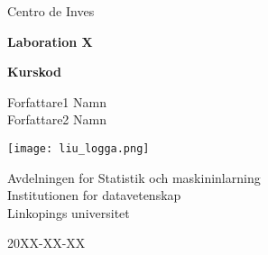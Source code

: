 \documentclass[11pt, openany]{article}
\begin{document}

\begin{titlepage}
  \clearpage\thispagestyle{empty}
  \centering
  \vspace{2cm}
  
  {\large Centro de Inves \par}
  \vspace{4cm}
  {\Huge \textbf{Laboration X}} \\
  \vspace{1cm}
  {\large \textbf{Kurskod} \par}
  \vspace{4cm}
         {\normalsize Forfattare1 Namn \\ %
           Forfattare2 Namn \par}
  \vspace{2cm}
  
  \texttt{[image: liu\_logga.png]}
  
  \vspace{2cm}
  
  {\normalsize Avdelningen for Statistik och maskininlarning \\
    Institutionen for datavetenskap \\
    Linkopings universitet \par}
  
  {\normalsize 20XX-XX-XX \par}
  \vspace{2cm}
  
  \pagebreak
  
\end{titlepage}

\tableofcontents{}

\clearpage



\end{document}
